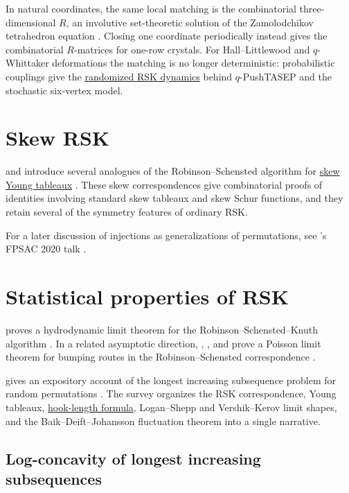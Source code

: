 In natural coordinates, the same local matching is the combinatorial
three-dimensional $R$, an involutive set-theoretic solution of the
Zamolodchikov tetrahedron equation \cite[Prop.~4.5]{Petrov2026x}.  Closing one
coordinate periodically instead gives the combinatorial $R$-matrices for
one-row crystals.  For Hall--Littlewood and $q$-Whittaker deformations the
matching is no longer deterministic: probabilistic couplings give the
\hyperref[probabilisticRSK]{randomized RSK dynamics} behind $q$-PushTASEP and
the stochastic six-vertex model.


\section[skewRSK]{Skew RSK}

 and  introduce several analogues of
the Robinson--Schensted algorithm for \hyperref[skewShapes]{skew Young tableaux}
\cite{SaganStanley1990SkewRSK}.  These skew correspondences give
combinatorial proofs of identities involving standard skew tableaux and skew
Schur functions, and they retain several of the symmetry features of ordinary
RSK.

For a later discussion of injections as generalizations of permutations, see
's FPSAC 2020 talk \cite{Lindzey2020FPSACTalk}.



\section[RSKstatistics]{Statistical properties of RSK}

 proves a hydrodynamic limit theorem for the
Robinson--Schensted--Knuth algorithm \cite{Marciniak2021}.  In a related
asymptotic direction, ,
, and  prove a Poisson
limit theorem for bumping routes in the Robinson--Schensted correspondence
\cite{MarciniakMaslankaSniady2021}.

 gives an expository account of the longest increasing
subsequence problem for random permutations \cite{Gupta2025x}.  The survey
organizes the RSK correspondence, Young tableaux,
\hyperref[partitionCores]{hook-length formula}, Logan--Shepp and
Vershik--Kerov limit shapes, and the Baik--Deift--Johansson fluctuation theorem
into a single narrative.


\subsection[lisLogConcavity]{Log-concavity of longest increasing subsequences}

